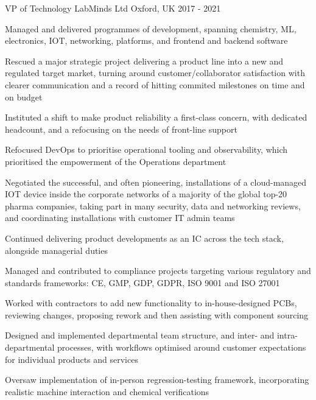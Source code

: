 \begin{cventries}
  \cventry
    {VP of Technology} %
    {LabMinds Ltd} %
    {Oxford, UK} %
    {2017 - 2021} %
    {
      \begin{cvitems} %
        \item {Managed and delivered programmes of development, spanning chemistry, ML, electronics, IOT, networking, platforms, and frontend and backend software}
        \item {Rescued a major strategic project delivering a product line into a new and regulated target market, turning around customer/collaborator satisfaction with clearer communication and a record of hitting commited milestones on time and on budget}
        \item {Instituted a shift to make product reliability a first-class concern, with dedicated headcount, and a refocusing on the needs of front-line support}
        \item {Refocused DevOps to prioritise operational tooling and observability, which prioritised the empowerment of the Operations department}
        \item {Negotiated the successful, and often pioneering, installations of a cloud-managed IOT device inside the corporate networks of a majority of the global top-20 pharma companies, taking part in many security, data and networking reviews, and coordinating installations with customer IT admin teams}
        \item {Continued delivering product developments as an IC across the tech stack, alongside managerial duties}
        \item {Managed and contributed to compliance projects targeting various regulatory and standards frameworks: CE, GMP, GDP, GDPR, ISO 9001 and ISO 27001}
        \item {Worked with contractors to add new functionality to in-house-designed PCBs, reviewing changes, proposing rework and then assisting with component sourcing}
        \item {Designed and implemented departmental team structure, and inter- and intra-departmental processes, with workflows optimised around customer expectations for individual products and services}
        \item {Oversaw implementation of in-person regression-testing framework, incorporating realistic machine interaction and chemical verifications}
      \end{cvitems}
}
\end{cventries}
